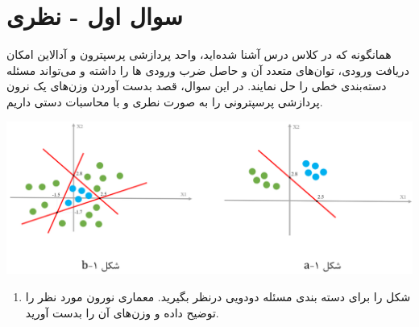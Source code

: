 \section{سوال اول - نظری}

همانگونه که در کلاس درس آشنا شده‌اید، واحد پردازشی پرسپترون و آدالاین امکان دریافت ورودی، توان‌های متعدد آن و حاصل ضرب ورودی ها را داشته و می‌تواند مسئله دسته‌بندی خطی را حل نمایند. در این سوال، قصد بدست آوردن وزن‌های یک نرون پردازشی پرسپترونی را به صورت نطری و با محاسبات دستی داریم.




\begin{center}
	\includegraphics*[width=1\linewidth]{pics/img1.png}
	\label{مسئله مورد بحث در سوال۱}
\end{center}



\begin{enumerate}
	\item شکل  را برای دسته بندی مسئله دودویی درنظر بگیرید. معماری نورون مورد نظر را توضیح داده و وزن‌های آن را بدست آورید.
\end{enumerate}











